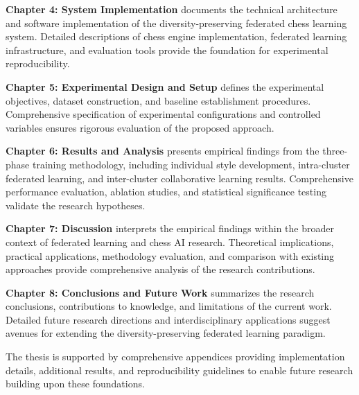 \textbf{Chapter 4: System Implementation} documents the technical architecture and software implementation of the diversity-preserving federated chess learning system. Detailed descriptions of chess engine implementation, federated learning infrastructure, and evaluation tools provide the foundation for experimental reproducibility.

\textbf{Chapter 5: Experimental Design and Setup} defines the experimental objectives, dataset construction, and baseline establishment procedures. Comprehensive specification of experimental configurations and controlled variables ensures rigorous evaluation of the proposed approach.

\textbf{Chapter 6: Results and Analysis} presents empirical findings from the three-phase training methodology, including individual style development, intra-cluster federated learning, and inter-cluster collaborative learning results. Comprehensive performance evaluation, ablation studies, and statistical significance testing validate the research hypotheses.

\textbf{Chapter 7: Discussion} interprets the empirical findings within the broader context of federated learning and chess AI research. Theoretical implications, practical applications, methodology evaluation, and comparison with existing approaches provide comprehensive analysis of the research contributions.

\textbf{Chapter 8: Conclusions and Future Work} summarizes the research conclusions, contributions to knowledge, and limitations of the current work. Detailed future research directions and interdisciplinary applications suggest avenues for extending the diversity-preserving federated learning paradigm.

The thesis is supported by comprehensive appendices providing implementation details, additional results, and reproducibility guidelines to enable future research building upon these foundations.